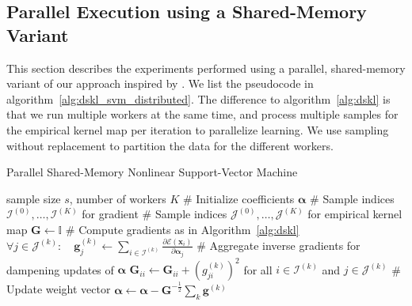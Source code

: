 \documentclass{article} %
\newcommand{\va}{\boldsymbol{\alpha}}
\renewcommand{\vec}[1]{\mathbf{#1}}
\begin{document}
 \subsection{Parallel Execution using a Shared-Memory Variant}\label{sec:distributed}
This section describes the experiments performed using a parallel, shared-memory variant of our approach inspired by \cite{Agarwal2014}. We list the pseudocode in algorithm~\autoref{alg:dskl_svm_distributed}. The difference to algorithm~\autoref{alg:dskl} is that we run multiple workers at the same time, and process multiple samples for the empirical kernel map per iteration to parallelize learning. We use sampling without replacement to partition the data for the different workers. 

 \begin{algorithm}
   \begin{algorithmic}[1]
     \caption{Parallel Shared-Memory Nonlinear Support-Vector Machine\label{alg:dskl_svm_distributed}}
       \REQUIRE sample size $s$, number of workers $K$
       \STATE \# Initialize coefficients $\va$
       \STATE \# Sample indices $\mathcal{I}^{(0)},\dots,\mathcal{I}^{(K)}$ for gradient 
       \STATE \# Sample indices $\mathcal{J}^{(0)},\dots,\mathcal{J}^{(K)}$ for empirical kernel map 
       \STATE $\vec{G} \leftarrow \mathbb{I}$
             \STATE \# Compute gradients as in Algorithm~\autoref{alg:dskl}
             \STATE $\forall j \in \mathcal{J}^{(k)}: \quad \vec{g}^{(k)}_{j} \gets \sum_{i\in\mathcal{I}^{(k)}}\frac{\partial \mathcal{E}(\vec{x}_i)}{\partial\va_{j}}$
             \STATE \# Aggregate inverse gradients for dampening updates of $\va$
             \STATE $\vec{G}_{ii} \leftarrow \vec{G}_{ii} + \left(g^{(k)}_{ji}\right)^2$ for all $i \in\mathcal{I}^{(k)}$ and $j\in\mathcal{J}^{(k)}$
           \ENDFOR
         \ENDFOR
         \STATE \# Update weight vector 
         \STATE $\va \leftarrow \va - \vec{G}^{-\frac{1}{2}} \sum_k \vec{g}^{(k)}$
       \ENDWHILE
   \end{algorithmic}
 \end{algorithm}
\end{document}
